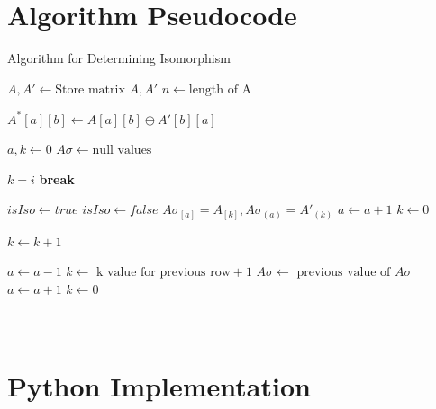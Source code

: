 \documentclass[12pt]{article}
\begin{document}
\section{\\Algorithm Pseudocode} \label{App: Appendix B}
\begin{algorithm}
\caption{Algorithm for Determining Isomorphism}
\begin{algorithmic}[1]

\State $A,A' \gets \text{Store matrix } A,A'$
\State $n \gets \text{length of A}$

\State $A^*[a][b] \gets A[a][b] \oplus A'[b][a]$
\EndFor

\State $a,k \gets 0$
\State $A\sigma \gets \text{null values}$


 \label{mainLoop}
$k = i$
\State \textbf{break}
\EndIf
\EndFor

\State $isIso \gets true$
 
\State $isIso \gets false$
\Else
\State $A\sigma_{[a]} = A_{[k]}, A\sigma_{(a)} = A'_{(k)}$
\State $a \gets a + 1$
\State $k \gets 0$
\EndIf

\State $k \gets k+1$

\State $a \gets a-1$
\State $k \gets \text{ k value for previous row}+1$
\State $A\sigma \gets \text{ previous value of } A\sigma$
\Else
\State $a \gets a + 1$
\State $k \gets 0$
\EndIf
\EndWhile

\EndProcedure
\end{algorithmic}
\end{algorithm}

\newpage
\section{\\Python Implementation} \label{App: Appendix C}
\singlespace

\end{document}
